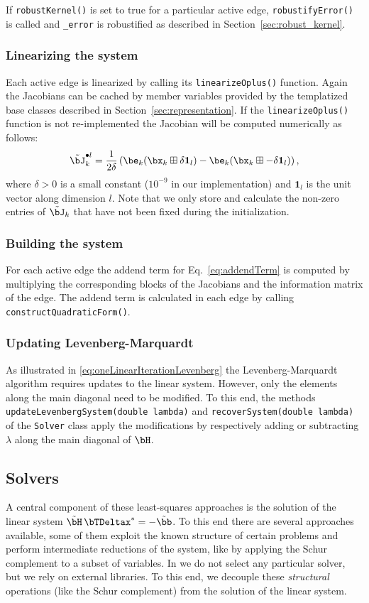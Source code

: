 \documentclass[a4paper]{article}
\begin{document}
 If \verb+robustKernel()+ is set to true for a particular active edge,
\verb+robustifyError()+ is called and \verb+_error+ is robustified
as described in Section~\ref{sec:robust_kernel}.

\subsubsection{Linearizing the system}
Each active edge is linearized by calling its
\verb+linearizeOplus()+ function. Again the Jacobians can be cached by
member variables provided by the templatized base classes described in
Section~\ref{sec:representation}. If the \verb+linearizeOplus()+
function is not re-implemented the Jacobian will be computed
numerically as follows:
\begin{eqnarray}
  \tilde \bJ_k^{\bullet l} = \frac{1}{2\delta} \left(
  \be_k (\bx_k \boxplus \delta\mathbf{1}_l)
  -
  \be_k (\bx_k \boxplus -\delta\mathbf{1}_l)
  \right),
  \label{eqn:jacobiannumeric}
\end{eqnarray}
where $\delta > 0$ is a small constant ($10^{-9}$ in our
implementation) and $\mathbf{1}_l$ is the unit vector along dimension
$l$. Note that we only store and calculate the non-zero entries of
$\tilde \bJ_k$ that have not been fixed during the initialization.

\subsubsection{Building the system}
For each active edge the addend term for Eq.~\ref{eq:addendTerm} is
computed by multiplying the corresponding blocks of the Jacobians and
the information matrix of the edge. The addend term is calculated in
each edge by calling \verb+constructQuadraticForm()+.

\subsubsection{Updating Levenberg-Marquardt}
As illustrated in \eqref{eq:oneLinearIterationLevenberg} the
Levenberg-Marquardt algorithm requires updates to the linear system.
However, only the elements along the main diagonal need to be modified.
To this end, the methods \verb+updateLevenbergSystem(double lambda)+ and
\verb+recoverSystem(double lambda)+ of the \verb+Solver+ class apply the
modifications by respectively adding or subtracting $\lambda$ along the
main diagonal of $\bH$.

\subsection{Solvers}
A central component of these least-squares approaches is the solution
of the linear system $\tilde \bH \, \bTDeltax^* = - \tilde \bb$. To
this end there are several approaches available, some of them exploit
the known structure of certain problems and perform intermediate
reductions of the system, like by applying the Schur complement to a
subset of variables.  In \gopt{} we do not select any particular solver,
but we rely on external libraries.  To this end, we decouple these
\emph{structural} operations (like the Schur complement)
from the solution of the linear system.
\end{document}

